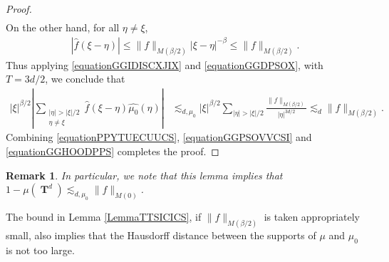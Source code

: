 \documentclass[12pt,reqno]{article}
\numberwithin{equation}{section}
\DeclareMathOperator{\TT}{\mathbf{T}}
\newtheorem{remark}[theorem]{Remark}
\numberwithin{theorem}{section}
\begin{document}
\begin{proof}
\begin{equation}
\begin{split}
    \end{split}
    \end{equation}
    On the other hand, for all $\eta \neq \xi$,
    \begin{equation} \label{equationGGDPSOX}
    \begin{split}
        |\widehat{f}(\xi - \eta)| \leq  \| f \|_{M(\beta/2)} |\xi - \eta|^{-\beta} \leq \| f \|_{M(\beta/2)}.
    \end{split}
    \end{equation}
    Thus applying \eqref{equationGGIDISCXJIX} and \eqref{equationGGDPSOX}, with $T = 3d/2$, we conclude that
    \begin{equation} \label{equationGGHOODPPS}
    \begin{split}
        |\xi|^{\beta/2} \left| \sum_{\substack{|\eta| > |\xi|/2\\ \eta \neq \xi}} \widehat{f}(\xi - \eta) \widehat{\mu_0}(\eta) \right| &\lesssim_{d,\mu_0} |\xi|^{\beta/2} \sum_{|\eta| > |\xi|/2} \frac{\| f \|_{M(\beta/2)}}{|\eta|^{3d/2}} \lesssim_d \| f \|_{M(\beta/2)}.
    \end{split}
    \end{equation}
    Combining \eqref{equationPPYTUECUUCS}, \eqref{equationGGPSOVVCSI} and \eqref{equationGGHOODPPS} completes the proof.
\end{proof}

\begin{remark} \label{remarkFOIJIOSJCIOSJ}
    In particular, we note that this lemma implies that $1 - \mu(\TT^d) \lesssim_{d,\mu_0} \| f \|_{M(0)}$.
\end{remark}

The bound in Lemma \ref{LemmaTTSICICS}, if $\| f \|_{M(\beta/2)}$ is taken appropriately small, also implies that the Hausdorff distance between the supports of $\mu$ and $\mu_0$ is not too large.
\end{document}
